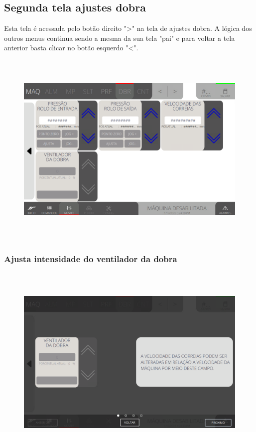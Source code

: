\subsection{Segunda tela ajustes dobra}\label{telaAjustesDobra2}
Esta tela é acessada pelo botão direito "\textgreater" na tela de ajustes dobra. A lógica dos outros menus continua sendo a mesma da sua tela "pai" e para voltar a tela anterior basta clicar no botão esquerdo "\textless{}".
\vspace*{\fill}
\begin{figure}[h]
  \centering
  \includegraphics[width=576px,height=360px]{src/imagesFlexo/07-fold/settings/e-Tela-Principal-2.png}
\end{figure}
\vspace*{\fill}


\newpage
\thispagestyle{fancy}
\vspace*{40 pt}
\subsubsection{\small{Ajusta intensidade do ventilador da dobra}}\label{telaAjustesDobra2AjustaIntensidadeVentiladorDobra}
\vspace*{\fill}
\begin{figure}[h]
  \centering
  \includegraphics[width=576px,height=360px]{src/imagesFlexo/07-fold/settings/e-6.png}
\end{figure}
\vspace*{\fill}


